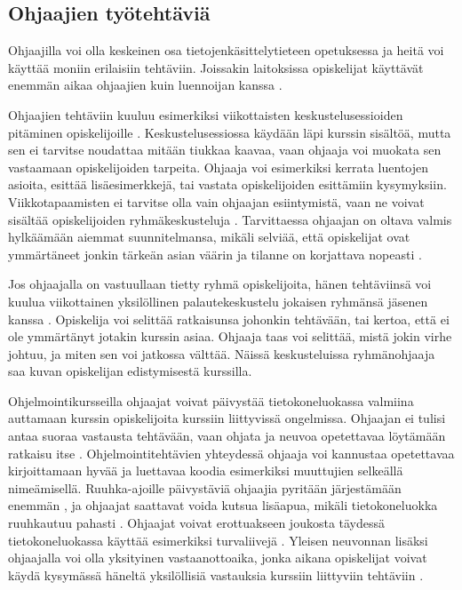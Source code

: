 \documentclass[finnish]{tktltiki2}
\theoremstyle{definition}
\theoremstyle{remark}
\begin{document}
\subsection{Ohjaajien työtehtäviä}
Ohjaajilla voi olla keskeinen osa tietojenkäsittelytieteen opetuksessa ja heitä voi käyttää moniin erilaisiin tehtäviin. Joissakin laitoksissa opiskelijat käyttävät enemmän aikaa ohjaajien kuin luennoijan kanssa \cite{Patitsas12_3}.\par

Ohjaajien tehtäviin kuuluu esimerkiksi viikottaisten keskustelusessioiden pitäminen opiskelijoille \cite{Reges88}. Keskustelusessiossa käydään läpi kurssin sisältöä, mutta sen ei tarvitse noudattaa mitään tiukkaa kaavaa, vaan ohjaaja voi muokata sen vastaamaan opiskelijoiden tarpeita. Ohjaaja voi esimerkiksi kerrata luentojen asioita, esittää lisäesimerkkejä, tai vastata opiskelijoiden esittämiin kysymyksiin. Viikkotapaamisten ei tarvitse olla vain ohjaajan esiintymistä, vaan ne voivat sisältää opiskelijoiden ryhmäkeskusteluja \cite{Decker06}. Tarvittaessa ohjaajan on oltava valmis hylkäämään aiemmat suunnitelmansa, mikäli selviää, että opiskelijat ovat ymmärtäneet jonkin tärkeän asian väärin ja tilanne on korjattava nopeasti \cite{Reges88}. \par

Jos ohjaajalla on vastuullaan tietty ryhmä opiskelijoita, hänen tehtäviinsä voi kuulua viikottainen yksilöllinen palautekeskustelu jokaisen ryhmänsä jäsenen kanssa \cite{Reges88,Reges03}. Opiskelija voi selittää ratkaisunsa johonkin tehtävään, tai kertoa, että ei ole ymmärtänyt jotakin kurssin asiaa. Ohjaaja taas voi selittää, mistä jokin virhe johtuu, ja miten sen voi jatkossa välttää. Näissä keskusteluissa ryhmänohjaaja saa kuvan opiskelijan edistymisestä kurssilla.  \par

Ohjelmointikursseilla ohjaajat voivat päivystää tietokoneluokassa valmiina auttamaan kurssin opiskelijoita kurssiin liittyvissä ongelmissa. Ohjaajan ei tulisi antaa suoraa vastausta tehtävään, vaan ohjata ja neuvoa opetettavaa löytämään ratkaisu itse \cite{Vikberg, Kurhila11}. Ohjelmointitehtävien yhteydessä ohjaaja voi kannustaa opetettavaa kirjoittamaan hyvää ja luettavaa koodia esimerkiksi muuttujien selkeällä nimeämisellä. Ruuhka-ajoille päivystäviä ohjaajia pyritään järjestämään enemmän \cite{Reges88, Reges03}, ja ohjaajat saattavat voida kutsua lisäapua, mikäli tietokoneluokka ruuhkautuu pahasti \cite{Kurhila11}. Ohjaajat voivat erottuakseen joukosta täydessä tietokoneluokassa käyttää esimerkiksi turvaliivejä \cite{Vihavainen}. Yleisen neuvonnan lisäksi ohjaajalla voi olla yksityinen vastaanottoaika, jonka aikana opiskelijat voivat käydä kysymässä häneltä yksilöllisiä vastauksia kurssiin liittyviin tehtäviin \cite{Decker06}. \par
\end{document}
